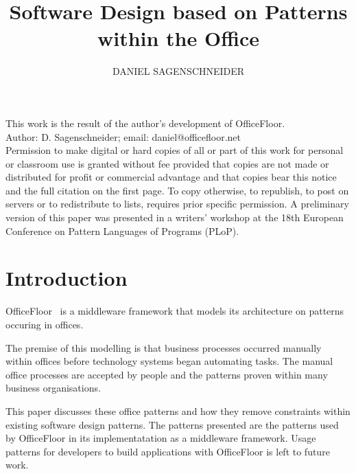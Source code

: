 \documentclass[prodmode]{style/acmlarge}
\title{Software Design based on Patterns within the Office}
\author{DANIEL SAGENSCHNEIDER \affil{OfficeFloor, daniel@officefloor.net}}
\begin{document}
\graphicspath{{./pdf/}}

\lstset{language=Java}

\captionsetup[lstlisting]{font=footnotesize}


\begin{bottomstuff}
This work is the result of the author's development of OfficeFloor.\\
Author: D. Sagenschneider; email: daniel@officefloor.net\\

Permission to make digital or hard copies of all or part of this work for
personal or classroom use is granted without fee provided that copies are not
made or distributed for profit or commercial advantage and that copies bear this
notice and the full citation on the first page. To copy otherwise, to republish,
to post on servers or to redistribute to lists, requires prior specific
permission. A preliminary version of this paper was presented in a writers'
workshop at the 18th European Conference on Pattern Languages of Programs
(PLoP).
\end{bottomstuff}

\maketitle




\section{Introduction}

OfficeFloor~\cite{officefloor} is a middleware framework that models its
architecture on patterns occuring in offices.

The premise of this modelling is that business processes occurred manually
within offices before technology systems began automating tasks.  The manual
office processes are accepted by people and the patterns proven within many
business organisations.

This paper discusses these office patterns and how they remove constraints
within existing software design patterns.  The patterns presented are the
patterns used by OfficeFloor in its implementatation as a middleware framework.
Usage patterns for developers to build applications with OfficeFloor is left to
future work.
\end{document}
